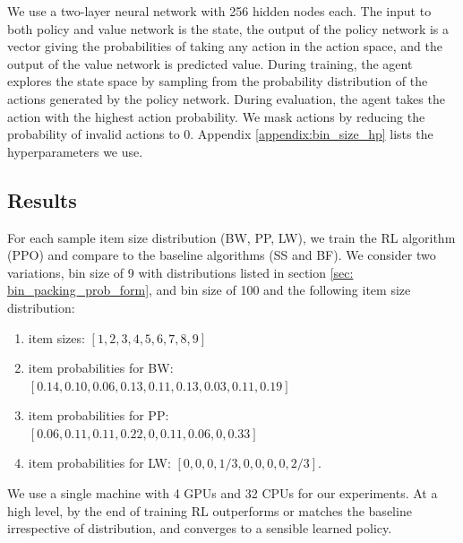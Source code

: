We use a two-layer neural network with 256 hidden nodes each. The input to both policy and value network is the state, the output of the policy network is a vector giving the probabilities of taking any action in the action space, and the output of the value network is predicted value. During training, the agent explores the state space by sampling from the probability distribution of the actions generated by the policy network. During evaluation, the agent takes the action with the highest action probability. We mask actions by reducing the probability of invalid actions to 0. Appendix \ref{appendix:bin_size_hp} lists the hyperparameters we use. 




\subsection{Results}
For each sample item size distribution (BW, PP, LW), we train the RL algorithm (PPO) and compare to the baseline algorithms (SS and BF).  We consider two variations, bin size of 9 with distributions listed in section \ref{sec: bin_packing_prob_form}, and bin size of 100 and the following item size distribution:

\begin{enumerate}[topsep=0pt,itemsep=-1ex,partopsep=1ex,parsep=1ex]
\item item sizes: $[1, 2, 3, 4, 5, 6, 7, 8, 9]$
\item item probabilities for BW: \\ $[0.14, 0.10, 0.06, 0.13, 0.11, 0.13, 0.03, 0.11, 0.19]$
\item item probabilities for PP: \\ $[0.06, 0.11, 0.11, 0.22, 0, 0.11, 0.06, 0, 0.33]$
\item item probabilities for LW: $[0, 0, 0, 1/3, 0, 0, 0, 0, 2/3]$.
\end{enumerate}
We use a single machine with 4 GPUs and 32 CPUs for our experiments. At a high level, by the end of training RL outperforms or matches the baseline irrespective of distribution, and converges to a sensible learned policy.

%
%

